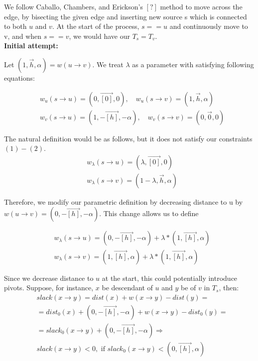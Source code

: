 \documentclass{article}
\begin{document}
We follow Caballo, Chambers, and Erickson's $[?]$ method to move across the edge,
by bisecting the given edge and inserting new source s which is connected to
both $u$ and $v$. At the start of the process, $s == u$ and continuously move to
v, and when $s == v$, we would have our $T_s = T_v$. \\

\textbf{Initial attempt:}

Let $(1, \vec{h}, \alpha) = w(u \rightarrow v)$. We treat $\lambda$ as a
parameter with satisfying following equations:

\begin{align}
&w_{u}(s \rightarrow u) = (0, \vec{[0]}, 0), \quad
  w_{u}(s \rightarrow v) = (1, \vec{h}, \alpha) \\
&w_{v}(s \rightarrow u) = (1, -\vec{[h]}, -\alpha), \quad
  w_{v}(s \rightarrow v) = (0, \vec{0}, 0)
\end{align}

The natural definition would be as follows, but it does not satisfy our
constraints $(1)-(2)$.
\begin{align}
&w_{\lambda}(s \rightarrow u) = (\lambda, \vec{[0]}, 0)  \\
&w_{\lambda}(s \rightarrow v) = (1 - \lambda, \vec{h}, \alpha)
\end{align}

Therefore, we modify our parametric definition by decreasing distance to u by
$w(u \rightarrow v) = (0, -\vec{[h]}, -\alpha)$. This change allows us to define

\begin{align}
&w_{\lambda}(s \rightarrow u) = (0, -\vec{[h]}, -\alpha) + 
\lambda * (1, \vec{[h]}, \alpha)  \\
&w_{\lambda}(s \rightarrow v) = (1, \vec{[h]}, \alpha) + 
\lambda * (1, \vec{[h]}, \alpha)
\end{align}

Since we decrease distance to $u$ at the start, this could potentially introduce
pivots. Suppose, for instance, $x$ be descendant of $u$ and $y$ be of $v$ in $T_s$,
then:
\begin{align}
& slack(x \rightarrow y) = dist(x) + w(x \rightarrow y) - dist(y) = \\
& = dist_0(x) + (0, -\vec{[h]}, -\alpha) + w(x \rightarrow y) - dist_0(y) = \\
& = slack_0(x \rightarrow y) + (0, -\vec{[h]}, -\alpha) \Rightarrow \\
& slack(x \rightarrow y) < 0, \text{ if } slack_0(x \rightarrow y) < 
(0,\vec{[h]},\alpha)
\end{align}
\end{document}
